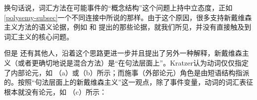 \ea\label{kill-argst-two}
\z
换句话说，词汇方法在可能事件的“概念结构”这个问题上持中立态度，正如\ref{polysemy-subsec}一个不同连接中所说的那样。由于这个原因，很多支持新戴维森主义方法的语义论据，例如 \citet[\S~4]{Schein93a-u}和 \citet{Lohndal2012a}提出的那些论据，就我们所见，并没有直接触及到词汇主义的核心问题。

但是 \citet{Kratzer96a}还有其他人，沿着这个思路更进一步并且提出了另外一种解释，新戴维森主义（或者更确切地说是混合方法）是“在句法层面上”。Kratzer认为动词仅仅指定了内部论元，如 （a）或（b）所示；而施事（外部论元）角色是由短语结构指派的。按照“句法层面上的新戴维森主义”这一观点，除了事件变量，动词的词汇表征根本就没有论元，如 （c）所示：

